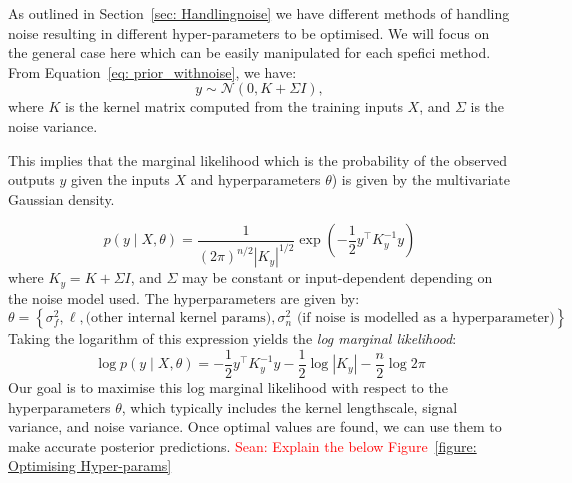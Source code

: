 \documentclass[11pt]{article}
\newcommand{\Sean}[1]{{\textcolor{red}{{Sean: #1}} }}
\begin{document}
\noindent
As outlined in Section~\ref{sec: Handlingnoise} we have different methods of handling noise resulting in different hyper-parameters to be optimised. We will focus on the general case here which can be easily manipulated for each spefici method.
From Equation~\ref{eq: prior_withnoise}, we have:
\[
y \sim \mathcal{N}(0, K + \Sigma I),
\]
where \( K \) is the kernel matrix computed from the training inputs \( X \), and \( \Sigma\) is the noise variance.

\noindent
This implies that the marginal likelihood which is the probability of the observed outputs \( y \) given the inputs \( X \) and hyperparameters \( \theta \)) is given by the multivariate Gaussian density. 

\[
p(y \mid X, \theta) = \frac{1}{(2\pi)^{n/2} |K_y|^{1/2}} \exp\left( -\frac{1}{2} y^\top K_y^{-1} y \right)
\]
where \( K_y = K + \Sigma I \), and \( \Sigma \) may be constant or input-dependent depending on the noise model used.
\noindent
The hyperparameters are given by:
\[
\theta = \left\{ \sigma_f^2, \ell, \text{(other internal kernel params)}, \sigma_n^2 \,\, \text{(if noise is modelled as a hyperparameter)} \right\}.
\]
\noindent
Taking the logarithm of this expression yields the \textit{log marginal likelihood}:
\begin{equation}\label{eq: 5}
\log p(y \mid X, \theta) = -\frac{1}{2} y^\top K_y^{-1} y - \frac{1}{2} \log |K_y| - \frac{n}{2} \log 2\pi
\end{equation}
\noindent
Our goal is to maximise this log marginal likelihood with respect to the hyperparameters \( \theta \), which typically includes the kernel lengthscale, signal variance, and noise variance. Once optimal values are found, we can use them to make accurate posterior predictions.
\Sean{Explain the below Figure~\ref{figure: Optimising Hyper-params}}
\end{document}
